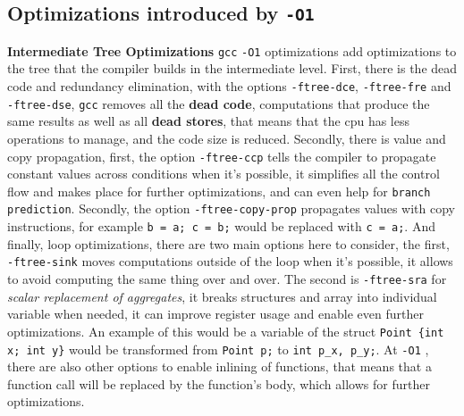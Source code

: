 \documentclass{rapport}
\newcommand{\gcc}{\texttt{gcc} }
\newcommand{\optione}{\texttt{-O1} }
\begin{document}
\subsection*{Optimizations introduced by \optione}
\textbf{Intermediate Tree Optimizations} \newline
\gcc \optione optimizations add optimizations to the tree that the compiler builds in the intermediate level.
\newline
First, there is the dead code and redundancy elimination, with the options \texttt{-ftree-dce}, \texttt{-ftree-fre} and \texttt{-ftree-dse}, \gcc removes all the \textbf{dead code}, 
computations that produce the same results as well as all \textbf{dead stores}, that means that the cpu has less operations to manage, and the code size is reduced.
\newline
Secondly, there is value and copy propagation, first, the option \texttt{-ftree-ccp} tells the compiler to propagate constant values across conditions when it's possible, 
it simplifies all the control flow and makes place for further optimizations, and can even help for \texttt{branch prediction}. \newline Secondly, the option \texttt{-ftree-copy-prop} 
propagates values with copy instructions, for example \texttt{b = a; c = b;} would be replaced with \texttt{c = a;}.
\newline
And finally, loop optimizations, there are two main options here to consider, the first, \texttt{-ftree-sink} moves computations outside of the loop when it's possible, it allows to 
avoid computing the same thing over and over. \newline
The second is \texttt{-ftree-sra} for \textit{scalar replacement of aggregates}, it breaks structures and array into individual variable when needed, it can improve register usage and 
enable even further optimizations. An example of this would be a variable of the struct \texttt{Point \{int x; int y\}} would be transformed from \texttt{Point p;} to 
\texttt{int p\_x, p\_y;}.
\newline\newline
At \optione, there are also other options to enable inlining of functions, that means that a function call will be replaced by the function's body, which allows for further optimizations.
\end{document}
